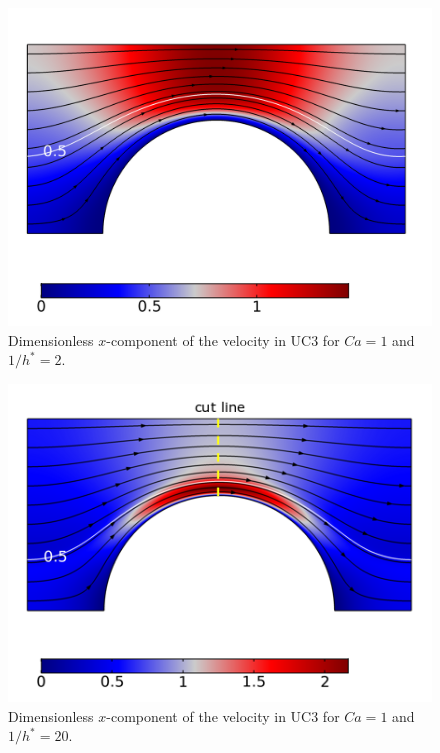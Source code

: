 \documentclass[]{article}
\begin{document}
\begin{figure}
\hypertarget{fig:UvelocityCa1LH2}{%
\centering
\includegraphics{figures/png/Uvelocity_Ca1LH2.png}
\caption{Dimensionless \(x\)-component of the velocity in UC3 for
\(Ca=1\) and \(1/h^*=2\).}\label{fig:UvelocityCa1LH2}
}
\end{figure}

\begin{figure}
\hypertarget{fig:UvelocityCa1LH20}{%
\centering
\includegraphics{figures/png/Uvelocity_Ca1LH20.png}
\caption{Dimensionless \(x\)-component of the velocity in UC3 for
\(Ca=1\) and \(1/h^*=20\).}\label{fig:UvelocityCa1LH20}
}
\end{figure}
\end{document}
